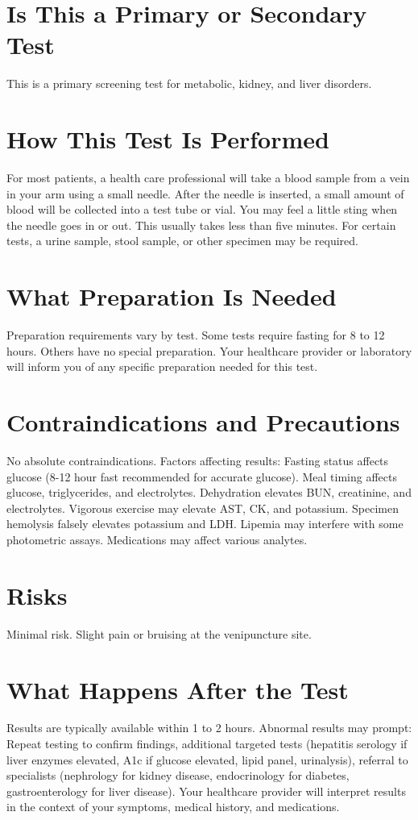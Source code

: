 \section*{Is This a Primary or Secondary Test}
This is a primary screening test for metabolic, kidney, and liver disorders.

\section*{How This Test Is Performed}
For most patients, a health care professional will take a blood sample from a vein in your arm using a small needle. After the needle is inserted, a small amount of blood will be collected into a test tube or vial. You may feel a little sting when the needle goes in or out. This usually takes less than five minutes. For certain tests, a urine sample, stool sample, or other specimen may be required.

\section*{What Preparation Is Needed}
Preparation requirements vary by test. Some tests require fasting for 8 to 12 hours. Others have no special preparation. Your healthcare provider or laboratory will inform you of any specific preparation needed for this test.

\section*{Contraindications and Precautions}
No absolute contraindications. Factors affecting results: Fasting status affects glucose (8-12 hour fast recommended for accurate glucose). Meal timing affects glucose, triglycerides, and electrolytes. Dehydration elevates BUN, creatinine, and electrolytes. Vigorous exercise may elevate AST, CK, and potassium. Specimen hemolysis falsely elevates potassium and LDH. Lipemia may interfere with some photometric assays. Medications may affect various analytes.

\section*{Risks}
Minimal risk. Slight pain or bruising at the venipuncture site.

\section*{What Happens After the Test}
Results are typically available within 1 to 2 hours. Abnormal results may prompt: Repeat testing to confirm findings, additional targeted tests (hepatitis serology if liver enzymes elevated, A1c if glucose elevated, lipid panel, urinalysis), referral to specialists (nephrology for kidney disease, endocrinology for diabetes, gastroenterology for liver disease). Your healthcare provider will interpret results in the context of your symptoms, medical history, and medications.

